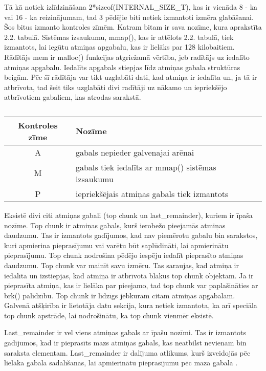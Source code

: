 Tā kā notiek izlīdzināšana 2*sizeof(INTERNAL\_SIZE\_T), kas ir vienāda 8 - ka vai 16 - ka  reizinājumam, tad 3 pēdējie biti netiek izmantoti izmēra glabāšanai. 
Šos bitus izmanto kontroles zīmēm. Katram bitam ir sava nozīme, kura aprakstīta 2.2. tabulā.
Sistēmas izsaukumu, mmap(), kas ir attēlots 2.2. tabulā, tiek izmantots, lai iegūtu atmiņas apgabalu, kas ir lielāks par 128 kilobaitiem. 
Rādītājs mem ir malloc() funkcijas atgriežamā vērtība, jeb radītājs uz iedalīto atmiņas apgabalu. Iedalīts apgabals stiepjas līdz atmiņas gabala struktūras beigām.
Pēc šī rādītāja var tikt uzglabāti dati, kad atmiņa ir iedalīta un, ja tā ir atbrīvota, tad šeit tiks uzglabāti divi radītāji uz nākamo un iepriekšējo atbrīvotiem gabaliem, kas atrodas sarakstā. 


  \begin{table}[H]
\caption{\textbf{\fontsize{11}{12}\selectfont {\\ Chunk gabala kontroles zīmes}}} 
\label{table:kysymys}
\centering
	\begin{tabular}{|c|l|r|p{5cm}|}
	  \hline
	Kontroles zīme & Nozīme \\
	\hline
	  A & gabals nepieder galvenajai arēnai \\
      \hline
      M & gabals tiek iedalīts ar mmap() sistēmas izsaukumu \\
      \hline
      P & iepriekšējais atmiņas gabals tiek izmantots  \\
    \hline
	\end{tabular}
\end{table}



Eksistē divi citi atmiņas gabali (top chunk un last\_remainder), kuriem ir īpaša nozīme. 
Top chunk ir atmiņas gabals, kurš ierobežo pieejamās atmiņas daudzumu.
Tas ir izmantots gadījumos, kad nav piemērotu gabalu bin sarakstos, kuri apmierina pieprasījumu vai varētu būt saplūdināti, lai apmierinātu pieprasījumu.
Top chunk nodrošina pēdējo iespēju iedalīt pieprasīto atmiņas daudzumu.
Top chunk var mainīt savu izmēru. Tas saraujas, kad atmiņa ir iedalīta un izstiepjas, kad atmiņa ir atbrīvota blakus top chunk objektam. 
Ja ir pieprasīta atmiņa, kas ir lielāka par pieejamo, tad top chunk var paplašināties ar brk() palīdzību.
Top chunk ir līdzīgs jebkuram citam atmiņas apgabalam. 
Galvenā atšķirība ir lietotāja datu sekcija, kura netiek izmantota, ka arī speciāla top chunk apstrāde, lai nodrošinātu, ka top chunk vienmēr eksistē.

Last\_remainder ir vel viens atmiņas gabals ar īpašu nozīmi.
Tas ir izmantots gadījumos, kad ir pieprasīts mazs atmiņas gabals, kas neatbilst nevienam bin saraksta elementam. 
Last\_remainder ir dalījuma atlikums, kurš izveidojās pēc lielāka gabala sadalīšanas, lai apmierinātu pieprasījumu pēc maza gabala  \cite {BLACKHAT}.


